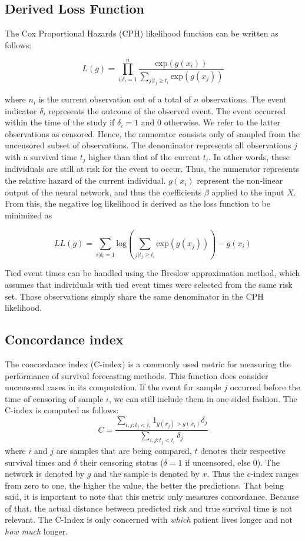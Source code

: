 \subsection{Derived Loss Function}
The Cox Proportional Hazards (CPH) likelihood function can be written as follows:

\[ L(g) = \prod_{i|\delta_{i}=1}^{n}\frac{\text{exp}(g(x_i))}{\sum_{j|t_{j}\ge{t_{i}}}\text{exp}(g(x_j))} \]

where $n_i$ is the current observation out of a total of $n$ observations. The event indicator $\delta_i$ represents the outcome of the observed event. The event occurred within the time of the study if $\delta_i=1$ and \(0\) otherwise. We refer to the latter observations as censored. Hence, the numerator consists only of sampled from the uncensored subset of observations. The denominator represents all observations $j$ with a survival time $t_j$ higher than that of the current $t_i$. In other words, these individuals are still at risk for the event to occur. Thus, the numerator represents the relative hazard of the current individual.
$g(x_i)$ represent the non-linear output of the neural network, and thus the coefficients \(\beta\) applied to the input \(X\).
From this, the negative log likelihood is derived as the loss function to be minimized as

\[ LL(g) = \sum_{i|\delta_{i}=1} \text{log} \left(\sum_{j|t_{j}\ge{t_{i}}} \text{exp} (g(x_{j})) \right)- g(x_{i})\]

Tied event times can be handled using the Breslow approximation method, which assumes that individuals with tied event times were selected from the same risk set. Those observations simply share the same denominator in the CPH likelihood. \cite{Breslow1974Covariance, Yang2022FastCPH}

\subsection{Concordance index}
The concordance index (C-index) is a commonly used metric for measuring the performance of survival forecasting methods. This function does consider uncensored cases in its computation. If the event for sample $j$ occurred before the time of censoring of sample $i$, we can still include them in one-sided fashion.  \cite{Schneider2022Integration}
The C-index is computed as follows: 
\[  C = \frac{\sum_{i,j:t_{j}<t_{i}} 1_{g(x_{j}) > g(x_{i})}\delta_{j}}{\sum_{i,j:t_{j}<t_{i}} \delta_{j}} \]
where $i$ and $j$ are samples that are being compared, $t$ denotes their respective survival times and $\delta$ their censoring status ($\delta = 1$ if uncensored, else $0$). The network is denoted by $g$ and the sample is denoted by $x$.\cite{Yang2022FastCPH} Thus the c-index ranges from zero to one, the higher the value, the better the predictions. That being said, it is important to note that this metric only measures concordance. Because of that, the actual distance between predicted risk and true survival time is not relevant. The C-Index is only concerned with \textit{which} patient lives longer and not \textit{how much} longer.

